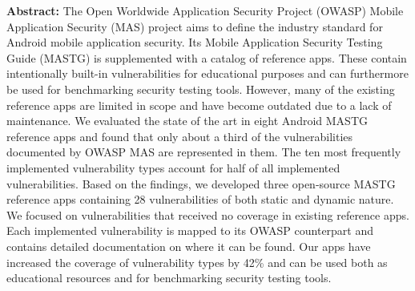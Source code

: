 \textbf{Abstract:} \hspace{0.3cm} The Open Worldwide Application Security Project (OWASP) Mobile Application Security (MAS) project aims to define the industry standard for Android mobile application security. Its Mobile Application Security Testing Guide (MASTG) is supplemented with a catalog of reference apps. These contain intentionally built-in vulnerabilities for educational purposes and can furthermore be used for benchmarking security testing tools. However, many of the existing reference apps are limited in scope and have become outdated due to a lack of maintenance. We evaluated the state of the art in eight Android MASTG reference apps and found that only about a third of the vulnerabilities documented by OWASP MAS are represented in them. The ten most frequently implemented vulnerability types account for half of all implemented vulnerabilities. Based on the findings, we developed three open-source MASTG reference apps containing 28 vulnerabilities of both static and dynamic nature. We focused on vulnerabilities that received no coverage in existing reference apps. Each implemented vulnerability is mapped to its OWASP counterpart and contains detailed documentation on where it can be found. Our apps have increased the coverage of vulnerability types by 42\% and can be used both as educational resources and for benchmarking security testing tools.